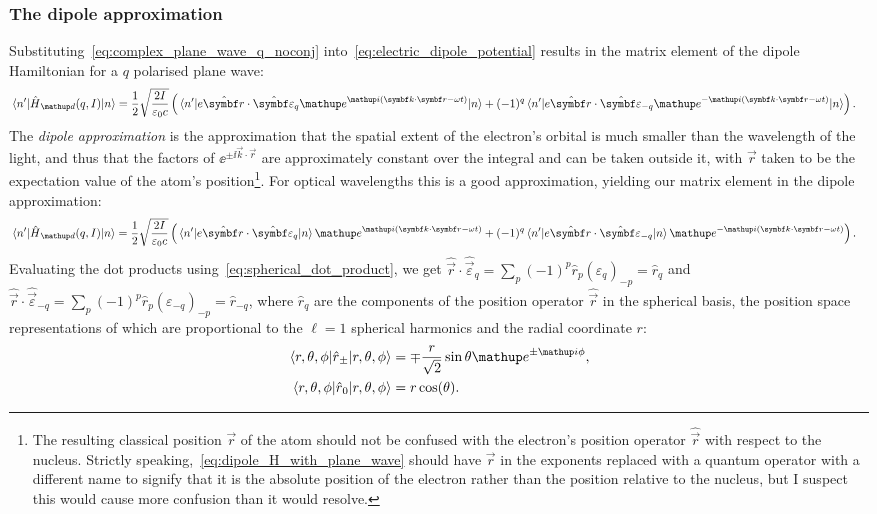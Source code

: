 \subsubsection{The dipole approximation}

Substituting~\eqref{eq:complex_plane_wave_q_noconj} into~\eqref{eq:electric_dipole_potential} results in the matrix element of the dipole Hamiltonian for a $q$ polarised plane wave:
\begin{align}\label{eq:dipole_H_with_plane_wave}
\matrixel{n^\prime}{\hat H_\up{d}(q,I)}{n} &= 
\frac12\sqrt{\frac{2I}{\varepsilon_0 c}}\left(
\matrixel{n^\prime}
  {e\hat{\vec r}\cdot\hat{\vec\varepsilon}_q \ee^{\ii(\vec k \cdot \vec r - \omega t)}}
  {n}
+(-1)^q
\matrixel{n^\prime}
  {e\hat{\vec r}\cdot\hat{\vec\varepsilon}_{-q} \ee^{-\ii(\vec k \cdot \vec r - \omega t)}}
  {n}\right).
\end{align}
The \emph{dipole approximation} is the approximation that the spatial extent of the electron's orbital is much smaller than the wavelength of the light, and thus that the factors of $\ee^{\pm\ii\vec k\cdot\vec r}$ are approximately constant over the integral and can be taken outside it, with $\vec r$ taken to be the expectation value of the atom's position\footnote{The resulting classical position $\vec r$ of the atom should not be confused with the electron's position operator $\hat{\vec r}$ with respect to the nucleus. Strictly speaking,~\eqref{eq:dipole_H_with_plane_wave} should have $\vec r$ in the exponents replaced with a quantum operator with a different name to signify that it is the absolute position of the electron rather than the position relative to the nucleus, but I suspect this would cause more confusion than it would resolve.}. For optical wavelengths this is a good approximation, yielding our matrix element in the dipole approximation:
\begin{align}
\matrixel{n^\prime}{\hat H_\up{d}(q,I)}{n} &= 
\frac12\sqrt{\frac{2I}{\varepsilon_0 c}}\left(
\matrixel{n^\prime}
  {e\hat{\vec r}\cdot\hat{\vec\varepsilon}_q}
  {n}\ee^{\ii(\vec k \cdot \vec r - \omega t)}
+(-1)^q
\matrixel{n^\prime}
  {e\hat{\vec r}\cdot\hat{\vec\varepsilon}_{-q}}
  {n} \ee^{-\ii(\vec k \cdot \vec r - \omega t)}\right).
\end{align}
Evaluating the dot products using~\eqref{eq:spherical_dot_product}, we get $\hat{\vec r}\cdot \hat{\vec\varepsilon}_q = \sum_p (-1)^p \hat r_p (\varepsilon_q)_{-p} = \hat r_q$ and $\hat{\vec r}\cdot \hat{\vec\varepsilon}_{-q} = \sum_p (-1)^p \hat r_p (\varepsilon_{-q})_{-p} = \hat r_{-q}$, where $\hat r_q$ are the components of the position operator $\hat{\vec r}$ in the spherical basis, the position space representations of which are proportional to the $\ell=1$ spherical harmonics and the radial coordinate $r$:
\begin{align}
\matrixel{r, \theta, \phi}{\hat r_\pm}{r, \theta, \phi}
    &= \mp\frac r {\sqrt2}\sin\theta\ee^{\pm\ii\phi},\\
\matrixel{r, \theta, \phi}{\hat r_0}{r, \theta, \phi} &= r\cos(\theta).
\end{align}

